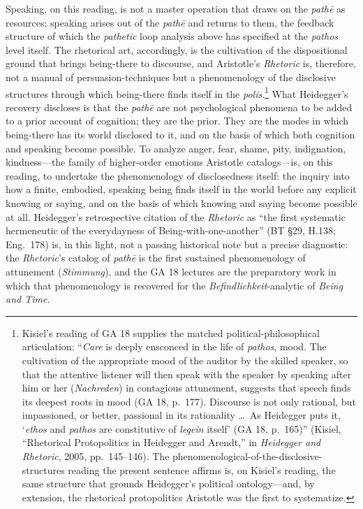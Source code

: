 \documentclass{article}
\begin{document}
Speaking, on this reading, is not a master operation that draws on the \textit{pathē} as resources; speaking arises out of the \textit{pathē} and returns to them, the feedback structure of which the \textit{pathetic} loop analysis above has specified at the \textit{pathos} level itself. The rhetorical art, accordingly, is the cultivation of the dispositional ground that brings being-there to discourse, and Aristotle's \textit{Rhetoric} is, therefore, not a manual of persuasion-techniques but a phenomenology of the disclosive structures through which being-there finds itself in the \textit{polis}.\footnote{Kisiel's reading of GA 18 supplies the matched political-philosophical articulation: ``\textit{Care} is deeply ensconced in the life of \textit{pathos}, mood. The cultivation of the appropriate mood of the auditor by the skilled speaker, so that the attentive listener will then speak with the speaker by speaking after him or her (\textit{Nachreden}) in contagious attunement, suggests that speech finds its deepest roots in mood (GA 18, p.~177). Discourse is not only rational, but impassioned, or better, passional in its rationality \ldots\ As Heidegger puts it, `\textit{ethos} and \textit{pathos} are constitutive of \textit{legein} itself' (GA 18, p.~165)'' (Kisiel, ``Rhetorical Protopolitics in Heidegger and Arendt,'' in \textit{Heidegger and Rhetoric}, 2005, pp.~145--146). The phenomenological-of-the-disclosive-structures reading the present sentence affirms is, on Kisiel's reading, the same structure that grounds Heidegger's political ontology---and, by extension, the rhetorical protopolitics Aristotle was the first to systematize.} What Heidegger's recovery discloses is that the \textit{pathē} are not psychological phenomena to be added to a prior account of cognition; they are the prior. They are the modes in which being-there has its world disclosed to it, and on the basis of which both cognition and speaking become possible. To analyze anger, fear, shame, pity, indignation, kindness---the family of higher-order emotions Aristotle catalogs---is, on this reading, to undertake the phenomenology of disclosedness itself: the inquiry into how a finite, embodied, speaking being finds itself in the world before any explicit knowing or saying, and on the basis of which knowing and saying become possible at all. Heidegger's retrospective citation of the \textit{Rhetoric} as ``the first systematic hermeneutic of the everydayness of Being-with-one-another'' (BT \S29, H.138; Eng.~178) is, in this light, not a passing historical note but a precise diagnostic: the \textit{Rhetoric}'s catalog of \textit{pathē} is the first sustained phenomenology of attunement (\textit{Stimmung}), and the GA 18 lectures are the preparatory work in which that phenomenology is recovered for the \textit{Befindlichkeit}-analytic of \textit{Being and Time}.
\end{document}
